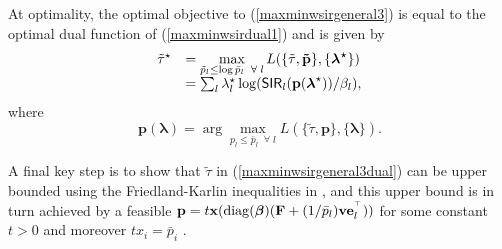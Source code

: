 \documentclass[10pt,twocolumn]{IEEEtran}
\newcommand{\0}{\mathbf{0}}
\newcommand{\1}{\mathbf{1}}
\def\diag{\mathop{{\rm diag}}\nolimits}
\newcommand{\trans}{^\top}
\begin{document}
At optimality, the optimal objective to (\ref{maxminwsirgeneral3}) is equal to the optimal dual function of (\ref{maxminwsirdual1}) and is given by
\begin{equation}
\label{maxminwsirgeneral3dual}
\begin{array}
[c]{rl}
\tilde{\tau}^{\star} & = \displaystyle \max_{\tilde{p}_l \le \log \bar{p}_l  \;\; \forall \; l} L(\{\tilde{\tau},\mathbf{\tilde{p}}\},\{\boldsymbol{\lambda^{\star}}\}) \\
& = \sum_l \lambda^{\star}_l \log (\mathsf{SIR}_l(\mathbf{p}(\boldsymbol{\lambda}^{\star}))/\beta_l),
\end{array}
\end{equation}
where
\begin{equation}
\label{plambda0}
\mathbf{p}(\boldsymbol{\lambda})=\arg \max_{p_l \le \bar{p}_l  \;\; \forall \; l} L(\{\tilde{\tau},\mathbf{p}\},\{\boldsymbol{\lambda}\}).
\end{equation}

A final key step is to show that $\tilde{\tau}$ in (\ref{maxminwsirgeneral3dual}) can be upper bounded using the Friedland-Karlin inequalities in \cite{Friedland75}, and this upper bound is in turn achieved by a feasible $\mathbf{p}=t \mathbf{x}(\diag(\boldsymbol{\beta})(\mathbf{F}+(1/\bar{p}_l)\mathbf{v}\mathbf{e}_l^{\trans}))$ for some constant $t>0$ and moreover $tx_i = \bar{p}_i$ \cite{Tan09atech}. 
\end{document}
